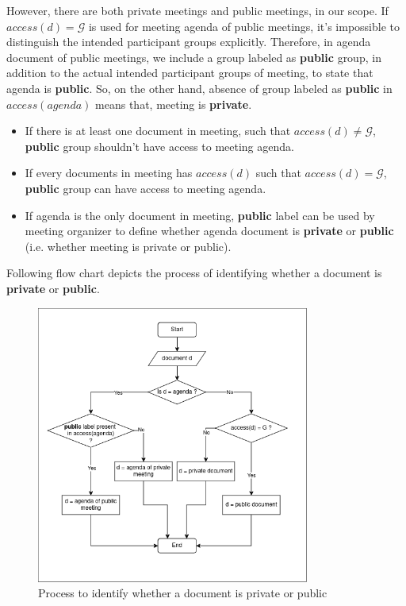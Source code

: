 However, there are both private meetings and public meetings, in our scope. If $access(d) = \mathcal{G}$ is used for meeting agenda of public meetings, it's impossible to distinguish the intended participant groups explicitly. Therefore, in agenda document of public meetings, we include a group labeled as \textbf{public} group, in addition to the actual intended participant groups of meeting, to state that agenda is \textbf{public}. So, on the other hand, absence of group labeled as \textbf{public} in $access(agenda)$ means that, meeting is \textbf{private}.
\begin{itemize}
    \item If there is at least one document in meeting, such that $access(d) \ne \mathcal{G}$, \textbf{public} group shouldn't have access to meeting agenda.
    \item If every documents in meeting has $access(d)$ such that $access(d) = \mathcal{G}$, \textbf{public} group can have access to meeting agenda.
    \item If agenda is the only document in meeting, \textbf{public} label can be used by meeting organizer to define whether agenda document is \textbf{private} or \textbf{public} (i.e. whether meeting is private or public).
\end{itemize}

\noindent
Following flow chart depicts the process of identifying whether a document is \textbf{private} or \textbf{public}.
\begin{figure}[H]
    \centering
    \includegraphics[width=0.8\textwidth]{./image/document_puclic_vs_private_classification.png}
    \caption{Process to identify whether a document is private or public}
    \label{fig:process to identify whether a document is private or public}
\end{figure} 

